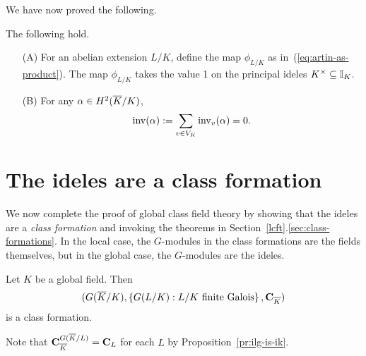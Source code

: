We have now proved the following.
\begin{thm}
The following hold.
\begin{enumerate}
\item[(A)]
For an abelian extension $L/K$, define the map $\phi_{L/K}$ as in~(\ref{eq:artin-as-product}). 
The map $\phi_{L/K}$ takes the value 1 on the principal ideles $K^{\times}\subseteq \mathbb{I}_K$.
\item[(B)]
For any $\alpha\in H^2(\overline{K}/K)$,
\[
\operatorname{inv}(\alpha):=\sum_{v\in V_K} \operatorname{inv}_v(\alpha)=0.
\]
\end{enumerate}
\end{thm}
\section{The ideles are a class formation}
We now complete the proof of global class field theory by showing that the ideles are a {\it class formation} and invoking the theorems in Section~\ref{lcft}.\ref{sec:class-formations}. In the local case, the $G$-modules in the class formations are the fields themselves, but in the global case, the $G$-modules are the ideles.
\begin{thm}
Let $K$ be a global field. Then 
\[(G(\overline{K}/K),\left\{{G(L/K)}:{L/K\text{ finite Galois}}\right\},\mathbf C_{\overline{K}})\]
is a class formation.
\end{thm}
Note that $\mathbf C_{\overline{K}}^{G(\overline{K}/L)}=\mathbf C_L$ for each $L$ by Proposition~\ref{pr:ilg-is-ik}.
